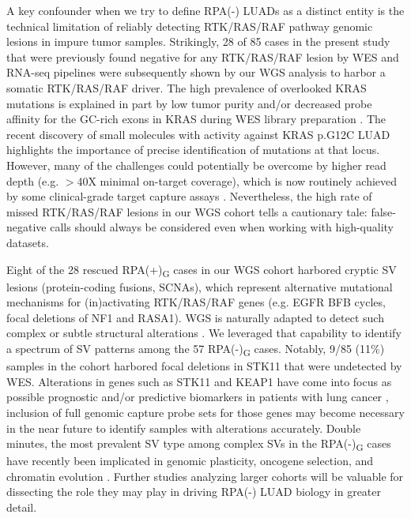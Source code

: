 \documentclass[phd,tocprelim]{cornell}
\begin{document}
A key confounder when we try to define RPA(-) LUADs as a distinct entity is the technical limitation of reliably detecting RTK/RAS/RAF pathway genomic lesions in impure tumor samples. Strikingly, 28 of 85 cases in the present study that were previously found negative for any RTK/RAS/RAF lesion by WES and RNA-seq pipelines were subsequently shown by our WGS analysis to harbor a somatic RTK/RAS/RAF driver. The high prevalence of overlooked KRAS mutations is explained in part by low tumor purity and/or decreased probe affinity for the GC-rich exons in KRAS during WES library preparation \cite{Clark2011-iq}. The recent discovery of small molecules with activity against KRAS p.G12C LUAD \cite{Canon2019-aj,Ostrem2013-lt} highlights the importance of precise identification of mutations at that locus. However, many of the challenges could potentially be overcome by higher read depth (e.g. $>$40X minimal on-target coverage), which is now routinely achieved by some clinical-grade target capture assays \cite{Goodman2017-wb,Zehir2017-ue}. Nevertheless, the high rate of missed RTK/RAS/RAF lesions in our WGS cohort tells a cautionary tale: false-negative calls should always be considered even when working with high-quality datasets.

Eight of the 28 rescued RPA(+)\textsubscript{G} cases in our WGS cohort harbored cryptic SV lesions (protein-coding fusions, SCNAs), which represent alternative mutational mechanisms for (in)activating RTK/RAS/RAF genes (e.g. EGFR BFB cycles, focal deletions of NF1 and RASA1). WGS is naturally adapted to detect such complex or subtle structural alterations \cite{Hadi2020-um}. We leveraged that capability to identify a spectrum of SV patterns among the 57 RPA(-)\textsubscript{G} cases. Notably, 9/85 (11\%) samples in the cohort harbored focal deletions in STK11 that were undetected by WES. Alterations in genes such as STK11 and KEAP1 have come into focus as possible prognostic and/or predictive biomarkers in patients with lung cancer \cite{Arbour2018-qg,Skoulidis2018-be}, inclusion of full genomic capture probe sets for those genes may become necessary in the near future to identify samples with alterations accurately. Double minutes, the most prevalent SV type among complex SVs in the RPA(-)\textsubscript{G} cases have recently been implicated in genomic plasticity, oncogene selection, and chromatin evolution \cite{Verhaak2019}. Further studies analyzing larger cohorts will be valuable for dissecting the role they may play in driving RPA(-) LUAD biology in greater detail.
\end{document}
